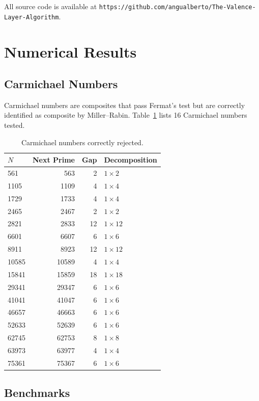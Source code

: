 \documentclass[12pt,a4paper]{article}
\theoremstyle{plain}
\begin{document}
All source code is available at
\texttt{https://github.com/angualberto/The-Valence-Layer-Algorithm}.

\section{Numerical Results}
\label{sec:num}

\subsection{Carmichael Numbers}

Carmichael numbers are composites that pass Fermat's test but are
correctly identified as composite by Miller--Rabin.
Table~\ref{tab:carmichael} lists 16 Carmichael numbers tested.

\begin{table}[htbp]
\centering
\caption{Carmichael numbers correctly rejected.}
\label{tab:carmichael}
\begin{tabular}{lrrl}
\hline
$N$ & Next Prime & Gap & Decomposition \\
\hline
561 & 563 & 2 & $1\times2$ \\
1105 & 1109 & 4 & $1\times4$ \\
1729 & 1733 & 4 & $1\times4$ \\
2465 & 2467 & 2 & $1\times2$ \\
2821 & 2833 & 12 & $1\times12$ \\
6601 & 6607 & 6 & $1\times6$ \\
8911 & 8923 & 12 & $1\times12$ \\
10585 & 10589 & 4 & $1\times4$ \\
15841 & 15859 & 18 & $1\times18$ \\
29341 & 29347 & 6 & $1\times6$ \\
41041 & 41047 & 6 & $1\times6$ \\
46657 & 46663 & 6 & $1\times6$ \\
52633 & 52639 & 6 & $1\times6$ \\
62745 & 62753 & 8 & $1\times8$ \\
63973 & 63977 & 4 & $1\times4$ \\
75361 & 75367 & 6 & $1\times6$ \\
\hline
\end{tabular}
\end{table}

\subsection{Benchmarks}
\end{document}
